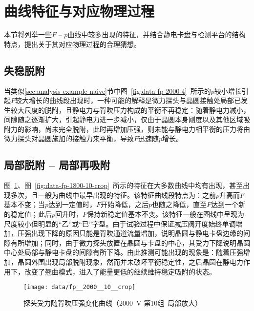 \clearpage



\section{曲线特征与对应物理过程}\label{sec:analysis-feature}

本节将列举一些$F$ -- $p$曲线中较多出现的特征，并结合静电卡盘与检测平台的结构特点，提出关于其对应物理过程的合理猜想。


\subsection{失稳脱附}\label{sec:analysis-feature-destabilize}

当类似\ref{sec:analysis-example-naive}节中图~\ref{fig:data-fp-2000-4}~所示的$p$较小增长引起$F$较大增长的曲线段出现时，一种可能的解释是微力探头与晶圆接触处局部已发生较大尺度的脱附，且静电力与背吹压力构成的平衡不再稳定：随着静电力减小，间隙随之逐渐扩大，引起静电力进一步减小，仅由于晶圆本身刚度以及其他区域吸附力的影响，尚未完全脱附，此时再增加压强，则未能与静电力相平衡的压力将由微力探头对晶圆施加的接触力来平衡，导致$F$迅速随$p$增长。


\subsection{局部脱附 -- 局部再吸附}\label{sec:analysis-feature-reattach}

图~\ref{fig:data-fp-2000-10-crop}、图~\ref{fig:data-fp-1800-10-crop}~所示的特征在大多数曲线中均有出现，甚至出现多次，且一般为曲线中最早出现的特征。该特征曲线段特点为：之前$p$升高而$F$基本不变；当$p$达到一定值时，$F$开始降低，之后$p$也随之降低，直至$F$达到一个新的稳定值；此后$p$回升时，$F$保持新稳定值基本不变。该特征一般在图线中呈现为尺度较小但明显的“乙”或“已”字型。由于试验过程中保证减压阀开度始终单调增加，压强出现下降的原因只能是背吹通道流量增加，说明晶圆与静电卡盘边缘的间隙有所增加；同时，由于微力探头放置在晶圆与卡盘的中心，其受力下降说明晶圆中心处局部与静电卡盘的间隙有所下降。由此推测可能出现的现象是：随着压强增加，晶圆外围出现局部脱附现象，然而并未破坏平衡稳定性，之后晶圆在静电力作用下，改变了翘曲模式，进入了能量更低的继续维持稳定吸附的状态。

\begin{figure}[thbp]
\centering
\texttt{[image: data/fp\_\_2000\_\_10\_\_crop]}
\caption{探头受力随背吹压强变化曲线（\SI{2000}{\V} 第10组\ 局部放大）}
\label{fig:data-fp-2000-10-crop}
\end{figure}


